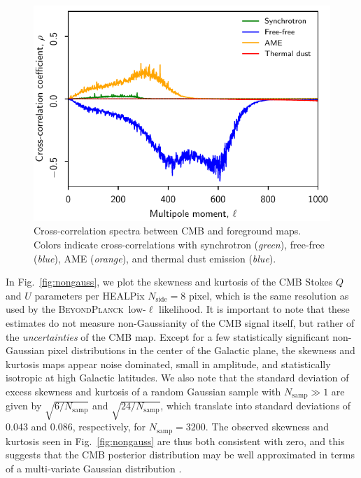\documentclass[twocolumn]{aa}
\newcommand{\BP}{\textsc{BeyondPlanck}}
\begin{document}
\begin{figure}
  \center	
  \includegraphics[width=\linewidth]{figs/crosscorr_CMB_fg_v1.pdf}
  \caption{Cross-correlation spectra between CMB and foreground maps. Colors indicate cross-correlations with synchrotron (\emph{green}), free-free (\emph{blue}), AME (\emph{orange}), and thermal dust emission (\emph{blue}). }
  \label{fig:fg_crosspec}
\end{figure}

In Fig.~\ref{fig:nongauss}, we plot the skewness and kurtosis of the
CMB Stokes $Q$ and $U$ parameters per HEALPix $N_{\mathrm{side}}=8$
pixel, which is the same resolution as used by the \BP\ low-$\ell$
likelihood. It is important to note that these estimates do not
measure non-Gaussianity of the CMB signal itself, but rather of the
\emph{uncertainties} of the CMB map. Except for a few statistically
significant non-Gaussian pixel distributions in the center of the
Galactic plane, the skewness and kurtosis maps appear noise dominated,
small in amplitude, and statistically isotropic at high Galactic
latitudes. We also note that the standard deviation of excess skewness
and kurtosis of a random Gaussian sample with $N_{\mathrm{samp}}\gg 1$
are given by $\sqrt{6/N_{\mathrm{samp}}}$ and
$\sqrt{24/N_{\mathrm{samp}}}$, which translate into standard
deviations of 0.043 and 0.086, respectively, for
$N_\mathrm{samp}=3200$. The observed skewness and kurtosis seen in
Fig.~\ref{fig:nongauss} are thus both consistent with zero, and this
suggests that the CMB posterior distribution may be well approximated
in terms of a multi-variate Gaussian distribution \citep{bp12}.
\end{document}
